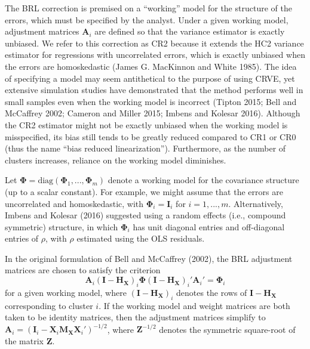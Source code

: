 \documentclass[12pt]{article}
\begin{document}
The BRL correction is premised on a ``working'' model for the structure
of the errors, which must be specified by the analyst. Under a given
working model, adjustment matrices \(\mathbf{A}_i\) are defined so that
the variance estimator is exactly unbiased. We refer to this correction
as CR2 because it extends the HC2 variance estimator for regressions
with uncorrelated errors, which is exactly unbiased when the errors are
homoskedastic (James G. MacKinnon and White 1985). The idea of
specifying a model may seem antithetical to the purpose of using CRVE,
yet extensive simulation studies have demonstrated that the method
performs well in small samples even when the working model is incorrect
(Tipton 2015; Bell and McCaffrey 2002; Cameron and Miller 2015; Imbens
and Kolesar 2016). Although the CR2 estimator might not be exactly
unbiased when the working model is misspecified, its bias still tends to
be greatly reduced compared to CR1 or CR0 (thus the name ``bias reduced
linearization''). Furthermore, as the number of clusters increases,
reliance on the working model diminishes.

Let
\(\boldsymbol\Phi = \text{diag}\left(\boldsymbol\Phi_1,...,\boldsymbol\Phi_m\right)\)
denote a working model for the covariance structure (up to a scalar
constant). For example, we might assume that the errors are uncorrelated
and homoskedastic, with \(\boldsymbol\Phi_i = \mathbf{I}_i\) for
\(i = 1,...,m\). Alternatively, Imbens and Kolesar (2016) suggested
using a random effects (i.e., compound symmetric) structure, in which
\(\boldsymbol\Phi_i\) has unit diagonal entries and off-diagonal entries
of \(\rho\), with \(\rho\) estimated using the OLS residuals.

In the original formulation of Bell and McCaffrey (2002), the BRL
adjustment matrices are chosen to satisfy the criterion \begin{equation}
\label{eq:CR2_criterion_BM}
\mathbf{A}_i \left(\mathbf{I} - \mathbf{H_X}\right)_i \boldsymbol\Phi \left(\mathbf{I} - \mathbf{H_X}\right)_i' \mathbf{A}_i'  =  \boldsymbol\Phi_i 
\end{equation} for a given working model, where
\(\left(\mathbf{I} - \mathbf{H_X}\right)_i\) denotes the rows of
\(\mathbf{I} - \mathbf{H_X}\) corresponding to cluster \(i\). If the
working model and weight matrices are both taken to be identity
matrices, then the adjustment matrices simplify to
\(\mathbf{A}_i = \left(\mathbf{I}_i - \mathbf{X}_i \mathbf{M_{X}} \mathbf{X}_i'\right)^{-1/2}\),
where \(\mathbf{Z}^{-1/2}\) denotes the symmetric square-root of the
matrix \(\mathbf{Z}\).
\end{document}
